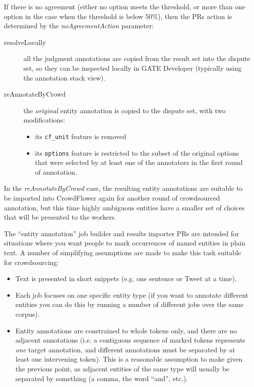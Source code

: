 If there is no agreement (either no option meets the threshold, or more than
one option in the case when the threshold is below 50\%), then the PRs action
is determined by the \emph{noAgreementAction} parameter:
\begin{description}
\item[resolveLocally] all the judgment annotations are copied from the result
  set into the dispute set, so they can be inspected locally in GATE Developer
  (typically using the annotation stack view).
\item[reAnnotateByCrowd] the \emph{original} entity annotation is copied to the
  dispute set, with two modifications:
  \begin{itemize}
  \item its \verb!cf_unit! feature is removed
  \item its \verb!options! feature is restricted to the subset of the original
    options that were selected by at least one of the annotators in the first
    round of annotation.
  \end{itemize}
\end{description}

In the \emph{reAnnotateByCrowd} case, the resulting entity annotations are
suitable to be imported into CrowdFlower again for another round of
crowdsourced annotation, but this time highly ambiguous entities have a smaller
set of choices that will be presented to the workers.


The ``entity annotation'' job builder and results importer PRs are intended
for situations where you want people to mark occurrences of named entities in
plain text.  A number of simplifying assumptions are made to make this task
suitable for crowdsourcing:
\begin{itemize}
\item Text is presented in short snippets (e.g. one sentence or Tweet at a
  time).
\item Each job focuses on one specific entity type (if you want to annotate
  different entities you can do this by running a number of different jobs over
  the same corpus).
\item Entity annotations are constrained to whole tokens only, and there are no
  adjacent annotations (i.e. a contiguous sequence of marked tokens represents
  \emph{one} target annotation, and different annotations must be separated
  by at least one intervening token).  This is a reasonable assumption to make
  given the previous point, as adjacent entities of the same type will usually
  be separated by something (a comma, the word ``and'', etc.).
\end{itemize}


